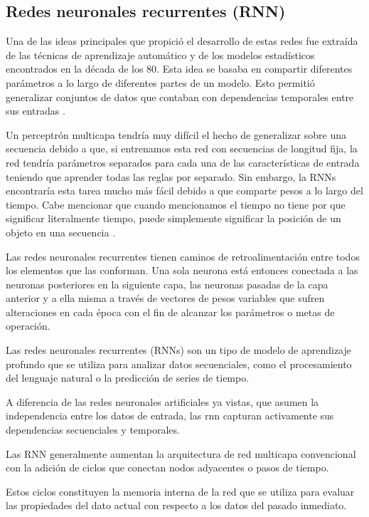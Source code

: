 \subsection{Redes neuronales recurrentes (RNN)}

Una de las ideas principales que propició el desarrollo de estas redes fue extraída de las técnicas de aprendizaje automático y de los modelos estadísticos encontrados en la década de los 80. Esta idea se basaba en compartir diferentes parámetros a lo largo de diferentes partes de un modelo. Esto permitió generalizar conjuntos de datos que contaban con dependencias temporales entre sus entradas \cite{Goodfellow-et-al-2016}.

Un perceptrón multicapa tendría muy difícil el hecho de generalizar sobre una secuencia debido a que, si entrenamos esta red con secuencias de longitud fija, la red tendría parámetros separados para cada una de las características de entrada teniendo que aprender todas las reglas por separado. Sin embargo, la RNNs encontraría esta tarea mucho más fácil debido a que comparte pesos a lo largo del tiempo. Cabe mencionar que cuando mencionamos el tiempo no tiene por que significar literalmente tiempo, puede simplemente significar la posición de un objeto en una secuencia \cite{roman2018redes}.

Las redes neuronales recurrentes tienen caminos de retroalimentación entre todos los elementos que las conforman. Una sola neurona está entonces conectada a las neuronas posteriores en la siguiente capa, las neuronas pasadas de la capa anterior y a ella misma a través de vectores de pesos variables que sufren alteraciones en cada época con el fin de alcanzar los parámetros o metas de operación\cite{montesdeoca2016estudios}.

Las redes neuronales recurrentes (RNNs) son un tipo de modelo de aprendizaje profundo que se utiliza para analizar datos secuenciales, como el procesamiento del lenguaje natural o la predicción de series de tiempo\cite{tomas2023prediccion}.

A diferencia de las redes neuronales artificiales ya vistas, que asumen la independencia entre los datos de entrada, las \gls{rnn} capturan activamente sus dependencias secuenciales y temporales\cite{arana2021redes}.

Las RNN generalmente aumentan la arquitectura de red multicapa convencional con la adición de ciclos que conectan nodos adyacentes o pasos de tiempo.

Estos ciclos constituyen la memoria interna de la red que se utiliza para evaluar las propiedades del dato actual con respecto a los datos del pasado inmediato.

